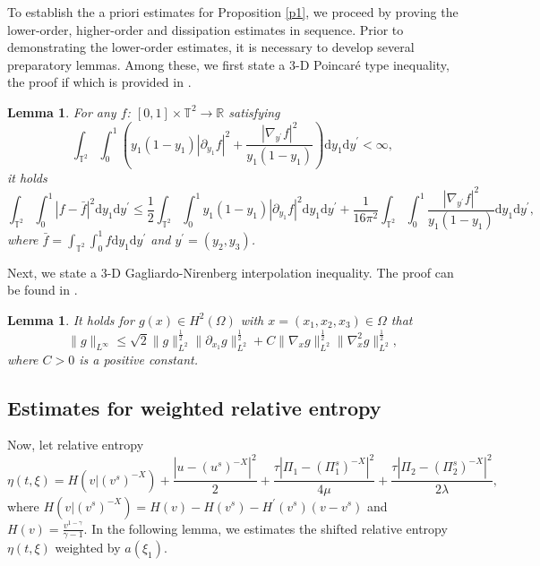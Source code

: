 \documentclass[10pt,reqno]{amsart}
\numberwithin{equation}{section}
\newtheorem{lemma}[theorem]{Lemma}
\newcommand{\dif}{\mathrm{d}}
\begin{document}
To establish the a priori estimates for Proposition \ref{p1}, we proceed by proving the lower-order, higher-order and dissipation estimates in sequence. Prior to demonstrating the lower-order estimates, it is necessary to develop several preparatory lemmas. Among these, we first state a 3-D Poincar\'e type inequality, the proof if which is provided in \cite{WWS}.

\begin{lemma}\label{poinbds}
For any $f$: $[0, 1]\times\mathbb{T}^2\rightarrow\mathbb{R}$ satisfying
\[
\int_{\mathbb{T}^2}\int_0^1\left(y_1(1-y_1)|\partial_{y_1}f|^2
  +\frac{|\nabla_{y^{\prime}}f|^2}{y_1(1-y_1)}\right)\dif y_1\dif y^{\prime}<\infty,
\]
it holds
\begin{equation}\label{czbds}
\int_{\mathbb{T}^2}\int_0^1|f-\bar{f}|^2\dif y_1\dif y^{\prime}\le
\frac{1}{2}\int_{\mathbb{T}^2}\int_0^1y_1(1-y_1)|\partial_{y_1}f|^2\dif y_1\dif y^{\prime}
+\frac{1}{16\pi^2}\int_{\mathbb{T}^2}\int_0^1\frac{|\nabla_{y^{\prime}}f|^2}{y_1(1-y_1)}\dif y_1\dif y^{\prime},
\end{equation}
where $\bar{f}=\int_{\mathbb{T}^2}\int_0^1f\dif y_1\dif y^{\prime}$ and $y^{\prime}=(y_2, y_3)$.
\end{lemma}

Next, we state a 3-D Gagliardo-Nirenberg interpolation inequality. The proof can be found in \cite{LWWR, WW1}.
\begin{lemma}\label{czbds1}
It holds for $g(x)\in H^2(\Omega)$ with $x=(x_1, x_2, x_3)\in\Omega$ that
\begin{equation}
\|g\|_{L^{\infty}}\le \sqrt{2}\|g\|_{L^{2}}^{\frac{1}{2}}\|\partial_{x_1}g\|_{L^{2}}^{\frac{1}{2}}
+C\|\nabla_xg\|_{L^{2}}^{\frac{1}{2}}\|\nabla_x^2g\|_{L^{2}}^{\frac{1}{2}},
\end{equation}
where $C>0$ is a positive constant.
\end{lemma}


\subsection{Estimates for weighted relative entropy}

Now, let relative entropy
$$\eta(t, \xi)=H(v|(v^s)^{-X})+\frac{|u-(u^s)^{-X}|^2}{2}
+\frac{\tau|\Pi_1-(\Pi_1^s)^{-X}|^2}{4\mu}+\frac{\tau|\Pi_2-(\Pi_2^s)^{-X}|^2}{2\lambda},$$ where $H(v|(v^s)^{-X})=H(v)-H(v^s)-H^{\prime}(v^s)(v-v^s)$ and $H(v)=\frac{v^{1-\gamma}}{\gamma-1}$.  In the following lemma, we estimates the shifted relative entropy $\eta(t, \xi)$ weighted by $a(\xi_1)$.
\end{document}
